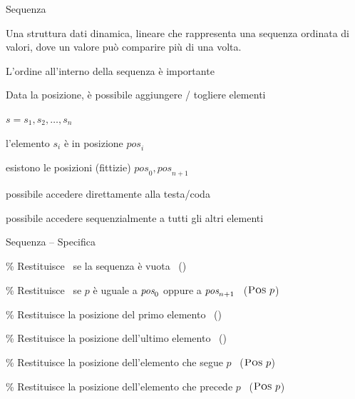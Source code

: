 \begin{frame}{Sequenza}

\begin{myboxtitle}[Sequenza]
Una struttura dati \alert{dinamica}, \alert{lineare} che rappresenta una 
sequenza \alert{ordinata} di valori, dove un valore può comparire
più di una volta.
\BI
\item L'ordine all'interno della sequenza è importante
\EI
\end{myboxtitle}

\begin{myboxtitle}
\BI
\item
Data la posizione, è possibile aggiungere / togliere elementi 
\BI
\item $s = s_1, s_2, \ldots, s_n$
\item l'elemento $s_i$ è in posizione $\mathit{pos}_i$
\item esistono le posizioni (fittizie) $\mathit{pos}_0, \mathit{pos}_{n+1}$
\EI
\item \EE possibile accedere direttamente alla testa/coda
\item \EE possibile accedere sequenzialmente a tutti gli altri elementi
\EI
\end{myboxtitle}
  
\end{frame}


\begin{frame}[shrink=10]{Sequenza -- Specifica}

\vspace{-12pt}
\begin{Procedure}
\caption[A]{\Sequence}

\BlankLine
\% Restituisce \TRUE\ se la sequenza è vuota\;
\alert{\BOOLEAN\ \listempty()\;}

\BlankLine
\% Restituisce \TRUE\ se $p$ è uguale a $\textit{pos}_0$ oppure a $\textit{pos}_{n+1}$\;
\alert{\BOOLEAN\ \listend($\Postype\ p$)\;}

\BlankLine
\% Restituisce la posizione del primo elemento\;
\alert{\Postype\ \listhead()\;}

\BlankLine
\% Restituisce la posizione dell'ultimo elemento\;
\alert{\Postype\ \listtail()\;}

\BlankLine
\% Restituisce la posizione dell'elemento che segue $p$\;
\alert{\Postype\ \listsucc($\Postype\ p$)\;}

\BlankLine
\% Restituisce la posizione dell'elemento che precede $p$\;
\alert{\Postype\ \listpred($\Postype\ p$)\;}

\end{Procedure}
\end{frame}

